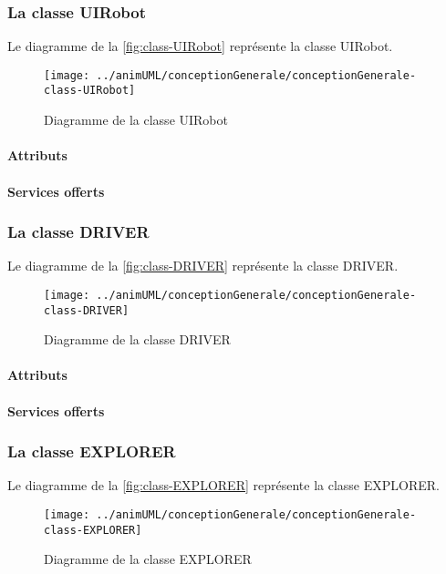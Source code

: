 \subsubsection{La classe UIRobot}

Le diagramme de la \autoref{fig:class-UIRobot} représente la classe UIRobot.
\begin{figure}[H]
	\centering
	\texttt{[image: ../animUML/conceptionGenerale/conceptionGenerale-class-UIRobot]}
	\caption{Diagramme de la classe UIRobot}
	\label{fig:class-UIRobot}
\end{figure}


\paragraph{Attributs}
\classUIRobotProperties
\paragraph{Services offerts}
\classUIRobotOperations
\subsubsection{La classe DRIVER}

Le diagramme de la \autoref{fig:class-DRIVER} représente la classe DRIVER.
\begin{figure}[H]
	\centering
	\texttt{[image: ../animUML/conceptionGenerale/conceptionGenerale-class-DRIVER]}
	\caption{Diagramme de la classe DRIVER}
	\label{fig:class-DRIVER}
\end{figure}


\paragraph{Attributs}
\classDRIVERProperties
\paragraph{Services offerts}
\classDRIVEROperations
\subsubsection{La classe EXPLORER}

Le diagramme de la \autoref{fig:class-EXPLORER} représente la classe EXPLORER.
\begin{figure}[H]
	\centering
	\texttt{[image: ../animUML/conceptionGenerale/conceptionGenerale-class-EXPLORER]}
	\caption{Diagramme de la classe EXPLORER}
	\label{fig:class-EXPLORER}
\end{figure}


